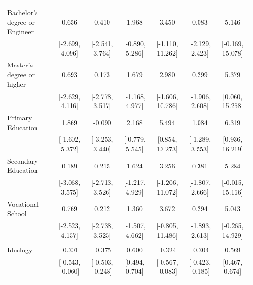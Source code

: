 \documentclass[
  10,
  letterpaper,
  DIV=11,
  numbers=noendperiod]{scrartcl}
\begin{document}
\begin{table}
\begin{tabular}[t]{lcccccc}
\addlinespace[0.3em]
\multicolumn{7}{l}{\cellcolor[HTML]{3498DB}{\textbf{Education}}}\\
\hspace{1em}Bachelor's degree or Engineer & 0.656 & 0.410 & 1.968 & 3.450 & 0.083 & 5.146\\
\hspace{1em} & {}[-2.699, 4.096] & {}[-2.541, 3.764] & {}[-0.890, 5.286] & {}[-1.110, 11.262] & {}[-2.129, 2.423] & {}[-0.169, 15.078]\\
\hspace{1em}Master's degree or higher & 0.693 & 0.173 & 1.679 & 2.980 & 0.299 & 5.379\\
\hspace{1em} & {}[-2.629, 4.116] & {}[-2.778, 3.517] & {}[-1.168, 4.977] & {}[-1.606, 10.786] & {}[-1.906, 2.608] & {}[0.060, 15.268]\\
\hspace{1em}Primary Education & 1.869 & -0.090 & 2.168 & 5.494 & 1.084 & 6.319\\
\hspace{1em} & {}[-1.602, 5.372] & {}[-3.253, 3.440] & {}[-0.779, 5.545] & {}[0.854, 13.273] & {}[-1.289, 3.553] & {}[0.936, 16.219]\\
\hspace{1em}Secondary Education & 0.189 & 0.215 & 1.624 & 3.256 & 0.381 & 5.284\\
\hspace{1em} & {}[-3.068, 3.575] & {}[-2.713, 3.526] & {}[-1.217, 4.929] & {}[-1.206, 11.072] & {}[-1.807, 2.666] & {}[-0.015, 15.166]\\
\hspace{1em}Vocational School & 0.769 & 0.212 & 1.360 & 3.672 & 0.294 & 5.043\\
\hspace{1em} & {}[-2.523, 4.137] & {}[-2.738, 3.525] & {}[-1.507, 4.662] & {}[-0.805, 11.486] & {}[-1.893, 2.613] & {}[-0.265, 14.929]\\
\addlinespace[0.3em]
\multicolumn{7}{l}{\cellcolor[HTML]{3498DB}{\textbf{Ideology}}}\\
\hspace{1em}Ideology & -0.301 & -0.375 & 0.600 & -0.324 & -0.304 & 0.569\\
\hspace{1em} & {}[-0.543, -0.060] & {}[-0.503, -0.248] & {}[0.494, 0.704] & {}[-0.567, -0.083] & {}[-0.423, -0.185] & {}[0.467, 0.674]\\
\addlinespace[0.3em]
\multicolumn{7}{l}{\cellcolor[HTML]{3498DB}{\textbf{Minority}}}\\

\end{tabular}
\end{table}
\end{document}
